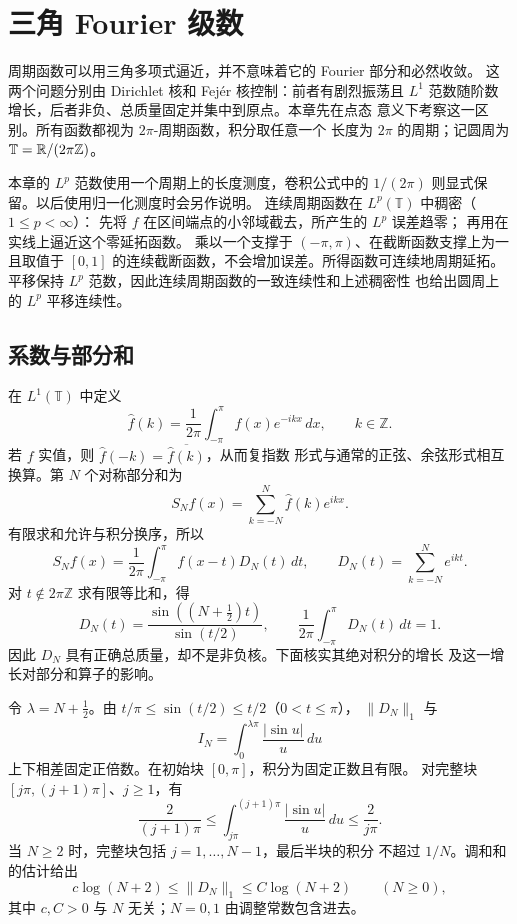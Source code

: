 \chapter{三角 Fourier 级数}
\label{chap:trigonometric-fourier-series}

周期函数可以用三角多项式逼近，并不意味着它的 Fourier 部分和必然收敛。
这两个问题分别由 Dirichlet 核和 Fejér 核控制：前者有剧烈振荡且
\(L^1\) 范数随阶数增长，后者非负、总质量固定并集中到原点。本章先在点态
意义下考察这一区别。所有函数都视为 \(2\pi\)-周期函数，积分取任意一个
长度为 \(2\pi\) 的周期；记圆周为 \(\mathbb T=\mathbb{R}/(2\pi\mathbb Z)\)。

本章的 \(L^p\) 范数使用一个周期上的长度测度，卷积公式中的
\(1/(2\pi)\) 则显式保留。以后使用归一化测度时会另作说明。
连续周期函数在 \(L^p(\mathbb T)\) 中稠密（\(1\le p<\infty\)）：
先将 \(f\) 在区间端点的小邻域截去，所产生的 \(L^p\) 误差趋零；
再用在实线上逼近这个零延拓函数。
乘以一个支撑于 \((-\pi,\pi)\)、在截断函数支撑上为一且取值于
\([0,1]\) 的连续截断函数，不会增加误差。所得函数可连续地周期延拓。
平移保持 \(L^p\) 范数，因此连续周期函数的一致连续性和上述稠密性
也给出圆周上的 \(L^p\) 平移连续性。

\section{系数与部分和}

在 \(L^1(\mathbb T)\) 中定义
\[
 \widehat f(k)=\frac1{2\pi}\int_{-\pi}^{\pi}f(x)e^{-ikx}\,dx,
 \qquad k\in\mathbb Z.
\]
若 \(f\) 实值，则 \(\widehat f(-k)=\overline{\widehat f(k)}\)，从而复指数
形式与通常的正弦、余弦形式相互换算。第 \(N\) 个对称部分和为
\[
 S_Nf(x)=\sum_{k=-N}^{N}\widehat f(k)e^{ikx}.
\]
有限求和允许与积分换序，所以
\begin{equation}\label{eq:fourier-dirichlet-convolution}
 S_Nf(x)=\frac1{2\pi}\int_{-\pi}^{\pi}f(x-t)D_N(t)\,dt,
 \qquad D_N(t)=\sum_{k=-N}^Ne^{ikt}.
\end{equation}
对 \(t\notin2\pi\mathbb Z\) 求有限等比和，得
\[
 D_N(t)=\frac{\sin((N+\tfrac12)t)}{\sin(t/2)},\qquad
 \frac1{2\pi}\int_{-\pi}^{\pi}D_N(t)\,dt=1.
\]
因此 \(D_N\) 具有正确总质量，却不是非负核。下面核实其绝对积分的增长
及这一增长对部分和算子的影响。

令 \(\lambda=N+\tfrac12\)。由
\(t/\pi\le\sin(t/2)\le t/2\)（\(0<t\le\pi\)），
\(\|D_N\|_1\) 与
\[
 I_N=\int_0^{\lambda\pi}\frac{|\sin u|}{u}\,du
\]
上下相差固定正倍数。在初始块 \([0,\pi]\)，积分为固定正数且有限。
对完整块 \([j\pi,(j+1)\pi]\)、\(j\ge1\)，有
\[
 \frac{2}{(j+1)\pi}\le
 \int_{j\pi}^{(j+1)\pi}\frac{|\sin u|}{u}\,du
 \le\frac{2}{j\pi}.
\]
当 \(N\ge2\) 时，完整块包括 \(j=1,\ldots,N-1\)，最后半块的积分
不超过 \(1/N\)。调和和的估计给出
\[
 c\log(N+2)\le\|D_N\|_1\le C\log(N+2)\qquad(N\ge0),
\]
其中 \(c,C>0\) 与 \(N\) 无关；\(N=0,1\) 由调整常数包含进去。

